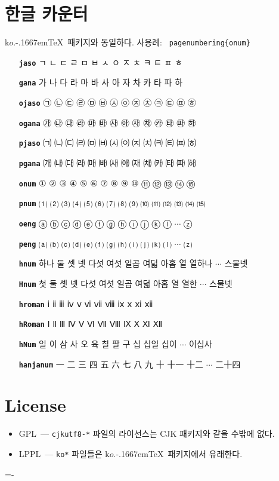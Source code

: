 \documentclass[dvipdfmx,b5paper]{article}
\def\cs#1{\texttt{\color{teal}\char92 #1}}
\def\koTeX{k$o$.\kern-.1667em\TeX}
\begin{document}
\section{한글 카운터}
\koTeX\ 패키지와 동일하다. 사용례: \cs{pagenumbering\{onum\}}
\begin{itemize}\leftskip=1cm =1em \itemsep=0pt plus0pt
      \def\cs#1{\texttt{\bfseries #1}}
  \item[\cs{jaso}] ㄱ ㄴ ㄷ ㄹ ㅁ ㅂ ㅅ ㅇ ㅈ ㅊ ㅋ ㅌ ㅍ ㅎ
  \item[\cs{gana}] 가 나 다 라 마 바 사 아 자 차 카 타 파 하
  \item[\cs{ojaso}] ㉠ ㉡ ㉢ ㉣ ㉤ ㉥ ㉦ ㉧ ㉨ ㉩ ㉪ ㉫ ㉬ ㉭
  \item[\cs{ogana}] ㉮ ㉯ ㉰ ㉱ ㉲ ㉳ ㉴ ㉵ ㉶ ㉷ ㉸ ㉹ ㉺ ㉻
  \item[\cs{pjaso}] ㈀ ㈁ ㈂ ㈃ ㈄ ㈅ ㈆ ㈇ ㈈ ㈉ ㈊ ㈋ ㈌ ㈍
  \item[\cs{pgana}] ㈎ ㈏ ㈐ ㈑ ㈒ ㈓ ㈔ ㈕ ㈖ ㈗ ㈘ ㈙ ㈚ ㈛
  \item[\cs{onum}]  ① ② ③ ④ ⑤ ⑥ ⑦ ⑧ ⑨ ⑩ ⑪ ⑫ ⑬ ⑭ ⑮
  \item[\cs{pnum}] ⑴ ⑵ ⑶ ⑷ ⑸ ⑹ ⑺ ⑻ ⑼ ⑽ ⑾ ⑿ ⒀ ⒁ ⒂
  \item[\cs{oeng}] ⓐ ⓑ ⓒ ⓓ ⓔ ⓕ ⓖ ⓗ ⓘ ⓙ ⓚ ⓛ $\cdots$ ⓩ
  \item[\cs{peng}] ⒜ ⒝ ⒞ ⒟ ⒠ ⒡ ⒢ ⒣ ⒤ ⒥ ⒦ ⒧ $\cdots$ ⒵
  \item[\cs{hnum}] 하나 둘 셋 넷 다섯 여섯 일곱 여덟 아홉 열 열하나 $\cdots$ 스물넷
  \item[\cs{Hnum}] 첫 둘 셋 넷 다섯 여섯 일곱 여덟 아홉 열 열한 $\cdots$ 스물넷
  \item[\cs{hroman}] ⅰ ⅱ ⅲ ⅳ ⅴ ⅵ ⅶ ⅷ ⅸ ⅹ ⅺ ⅻ
  \item[\cs{hRoman}] Ⅰ Ⅱ Ⅲ Ⅳ Ⅴ Ⅵ Ⅶ Ⅷ Ⅸ Ⅹ Ⅺ Ⅻ
  \item[\cs{hNum}] 일 이 삼 사 오 육 칠 팔 구 십 십일 십이 $\cdots$ 이십사
  \item[\cs{hanjanum}] 一 二 三 四 五 六 七 八 九 十 十一 十二 $\cdots$ 二十四
\end{itemize}

\section{License}
\begin{itemize}
  \item GPL~--- \verb|cjkutf8-*| 파일의 라이선스는 CJK 패키지와
    같을 수밖에 없다.
  \item LPPL~--- \verb|ko*| 파일들은 \koTeX\ 패키지에서 유래한다.
\end{itemize}

\begin{flushright}
  \fboxsep=-\fboxrule
\end{flushright}
\end{document}

